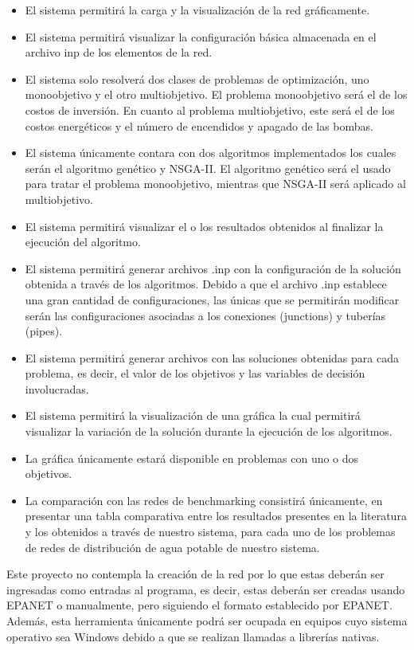 \documentclass[11pt,letterpaper]{article}
\begin{document}
\begin{itemize}

\item El sistema permitirá la carga y la visualización de la red gráficamente.
\item El sistema permitirá visualizar la configuración básica almacenada en el archivo inp de los elementos de la red.
\item El sistema solo resolverá dos clases de problemas de optimización, uno monoobjetivo y el otro multiobjetivo. El problema monoobjetivo será el de los costos de inversión. En cuanto al problema multiobjetivo, este será el de los costos energéticos y el número de encendidos y apagado de las bombas. 
\item El sistema únicamente contara con dos algoritmos implementados los cuales serán el algoritmo genético y NSGA-II. El algoritmo genético será el usado para tratar el problema monoobjetivo, mientras que NSGA-II será aplicado al multiobjetivo.
\item El sistema permitirá visualizar el o los resultados obtenidos al finalizar la ejecución del algoritmo.
\item El sistema permitirá generar archivos .inp con la configuración de la solución obtenida a través de los algoritmos. Debido a que el archivo .inp establece una gran cantidad de configuraciones, las únicas que se permitirán modificar serán las configuraciones asociadas a los conexiones (junctions) y tuberías (pipes).
\item El sistema permitirá generar archivos con las soluciones obtenidas para cada problema, es decir, el valor de los objetivos y las variables de decisión involucradas.
\item El sistema permitirá la visualización de una gráfica la cual permitirá visualizar la variación de la solución durante la ejecución de los algoritmos.
\item La gráfica únicamente estará disponible en problemas con uno o dos objetivos.
\item La comparación con las redes de benchmarking consistirá únicamente, en presentar una tabla comparativa entre los resultados presentes en la literatura y los obtenidos a través de nuestro sistema, para cada uno de los problemas de redes de distribución de agua potable de nuestro sistema.

\end{itemize}
Este proyecto no contempla la creación de la red por lo que estas deberán ser ingresadas como entradas al programa, es decir, estas deberán ser creadas usando EPANET o manualmente, pero siguiendo el formato establecido por EPANET. Además, esta herramienta únicamente podrá ser ocupada en equipos cuyo sistema operativo sea Windows debido a que se realizan llamadas a librerías nativas.
\end{document}
